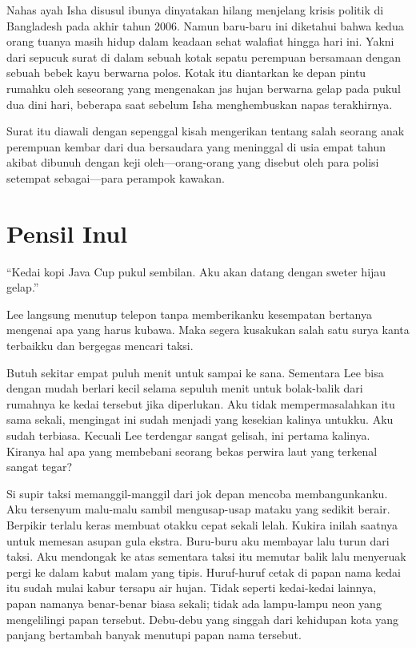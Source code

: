 \documentclass[smalldemyvopaper,11pt,twoside,onecolumn,openright,extrafontsizes]{memoir}
\begin{document}

Nahas ayah Isha disusul ibunya dinyatakan hilang menjelang krisis politik di Bangladesh pada akhir tahun 2006. Namun baru-baru ini diketahui bahwa kedua orang tuanya masih hidup dalam keadaan sehat walafiat hingga hari ini. Yakni dari sepucuk surat di dalam sebuah kotak sepatu perempuan bersamaan dengan sebuah bebek kayu berwarna polos. Kotak itu diantarkan ke depan pintu rumahku oleh seseorang yang mengenakan jas hujan berwarna gelap pada pukul dua dini hari, beberapa saat sebelum Isha menghembuskan napas terakhirnya.


Surat itu diawali dengan sepenggal kisah mengerikan tentang salah seorang anak perempuan kembar dari dua bersaudara yang meninggal di usia empat tahun akibat dibunuh dengan keji oleh---orang-orang yang disebut oleh para polisi setempat sebagai---para perampok kawakan.


\chapter{Pensil Inul}

``Kedai kopi Java Cup pukul sembilan. Aku akan datang dengan sweter hijau gelap.''

Lee langsung menutup telepon tanpa memberikanku kesempatan bertanya mengenai apa yang harus kubawa. Maka segera kusakukan salah satu surya kanta terbaikku dan bergegas mencari taksi.

Butuh sekitar empat puluh menit untuk sampai ke sana. Sementara Lee bisa dengan mudah berlari kecil selama sepuluh menit untuk bolak-balik dari rumahnya ke kedai tersebut jika diperlukan. Aku tidak mempermasalahkan itu sama sekali, mengingat ini sudah menjadi yang kesekian kalinya untukku. Aku sudah terbiasa. Kecuali Lee terdengar sangat gelisah, ini pertama kalinya. Kiranya hal apa yang membebani seorang bekas perwira laut yang terkenal sangat tegar?


Si supir taksi memanggil-manggil dari jok depan mencoba membangunkanku. Aku tersenyum malu-malu sambil mengusap-usap mataku yang sedikit berair. Berpikir terlalu keras membuat otakku cepat sekali lelah. Kukira inilah saatnya untuk memesan asupan gula ekstra. Buru-buru aku membayar lalu turun dari taksi. Aku mendongak ke atas sementara taksi itu memutar balik lalu menyeruak pergi ke dalam kabut malam yang tipis. Huruf-huruf cetak di papan nama kedai itu sudah mulai kabur tersapu air hujan. Tidak seperti kedai-kedai lainnya, papan namanya benar-benar biasa sekali; tidak ada lampu-lampu neon yang mengelilingi papan tersebut. Debu-debu yang singgah dari kehidupan kota yang panjang bertambah banyak menutupi papan nama tersebut.
\end{document}
